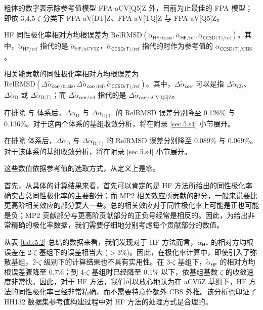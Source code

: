 \begin{table}[ht]
    \raggedright
    \par{} 粗体的数字表示除参考值模型 FPA-aCV[Q5]Z 外，目前为止最佳的 FPA 模型；即依 3,4,5-$\zeta$ 分类下 FPA-aV[DT]Z、FPA-aV[TQ]Z 与 FPA-aV[Q5]Z。
    \par{} HF 同性极化率相对方均根误差为 $\text{RelRMSD} (\tilde \alpha_{\textsf{HF}/\text{basis}}, \tilde \alpha_{\textsf{HF}/\text{ref}}, \tilde \alpha_{\textsf{CCSD(T)}/\text{ref}})$。其中，$\tilde \alpha_{\textsf{HF}/\text{ref}}$ 指代的是 $\tilde \alpha_{\textsf{HF}/\text{aCV5Z}}$，$\tilde \alpha_{\textsf{CCSD(T)}/\text{ref}}$ 指代的时作为参考值的 $\alpha_{\textsf{CCSD(T)}/\text{CBS}}$。
    \par{} 相关能贡献的同性极化率相对方均根误差为 $\text{RelRMSD} (\Delta \tilde \alpha_{\textsf{corr}/\text{basis}}, \Delta \tilde \alpha_{\textsf{corr}/\text{ref}}, \tilde \alpha_{\textsf{CCSD(T)}/\text{ref}})$。其中，$\Delta \tilde \alpha_{\textsf{corr}}$ 可以是指 $\Delta \tilde \alpha_{\textsf{(2)}}$、$\Delta \tilde \alpha_{\textsf{D}}$ 或 $\Delta \tilde \alpha_{\textsf{D(T)}}$；而 $\Delta \tilde \alpha_{\textsf{corr}/\text{ref}}$ 指代的是 $\Delta \tilde \alpha_{\textsf{corr}/\text{aCV[Q5]Z}}$。
    \par{} 在排除  与  体系后，$\Delta \tilde \alpha_\textsf{D}$ 与 $\Delta \tilde \alpha_\textsf{D(T)}$ 的 RelRMSD 误差分别降至 0.126\% 与 0.136\%。对于这两个体系的基组收敛分析，将在附录 \ref{sec.5.s4} 小节展开。
    \par{} 在排除  体系后，$\Delta \tilde \alpha_\textsf{D}$ 与 $\Delta \tilde \alpha_\textsf{D(T)}$ 的 RelRMSD 误差分别降至 0.089\% 与 0.069\%。对于该体系的基组收敛分析，将在附录 \ref{sec.5.s4} 小节展开。
    \par{} 这些数值依据参考值的选取方式，从定义上是零。
\end{table}

首先，从具体的计算结果来看，首先可以肯定的是 HF 方法所给出的同性极化率确实占总同性极化率的主要部分；而 MP2 相关效应所贡献的部分，一般来说要比更高阶相关效应的部分要大一些。总的相关效应对于同性极化率上可能是正也可能是负；MP2 贡献部分与更高阶贡献部分的正负号经常是相反的。因此，为给出非常精确的极化率数据，我们需要仔细地分别考虑每个贡献部分的数值。

从表 \ref{tab.5.2} 总结的数据来看，我们发现对于 HF 方法而言，$\tilde \alpha_\textsf{HF}$ 的相对方均根误差在 2-$\zeta$ 基组下的误差相当大 ($> 3\%$)。因此，在极化率计算中，即使引入了弥散基组，2-$\zeta$ 级别下的计算结果也不具有实用性。在 3-$\zeta$ 基组下，$\tilde \alpha_\textsf{HF}$ 的相对方均根误差骤降至 0.7\%；到 4-$\zeta$ 基组时已经降至 0.1\% 以下，依基组基数 $\zeta$ 的收敛速度非常快。因此，对于 HF 方法，我们可以放心地认为在 aCV5Z 基组下，HF 方法的同性极化率已经非常精确、而不需要特意作额外 CBS 外推。该分析也印证了 HH132 数据集参考值构建过程中对 HF 方法的处理方式是合理的\cite{Hait-Head-Gordon.PCCP.2018}。

